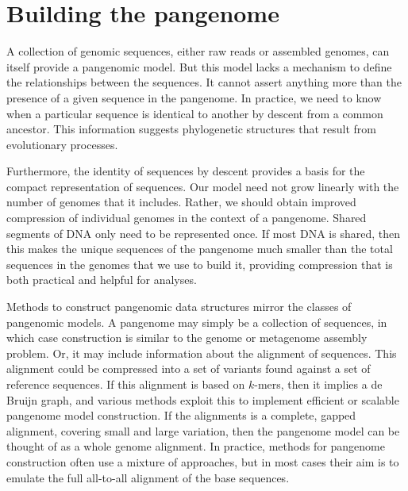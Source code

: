 \section{Building the pangenome}

A collection of genomic sequences, either raw reads or assembled genomes, can itself provide a pangenomic model.
But this model lacks a mechanism to define the relationships between the sequences.
It cannot assert anything more than the presence of a given sequence in the pangenome.
In practice, we need to know when a particular sequence is identical to another by descent from a common ancestor.
This information suggests phylogenetic structures that result from evolutionary processes.

Furthermore, the identity of sequences by descent provides a basis for the compact representation of sequences.
Our model need not grow linearly with the number of genomes that it includes.
Rather, we should obtain improved compression of individual genomes in the context of a pangenome.
Shared segments of DNA only need to be represented once.
If most DNA is shared, then this makes the unique sequences of the pangenome much smaller than the total sequences in the genomes that we use to build it, providing compression that is both practical and helpful for analyses.

Methods to construct pangenomic data structures mirror the classes of pangenomic models.
A pangenome may simply be a collection of sequences, in which case construction is similar to the genome or metagenome assembly problem.
Or, it may include information about the alignment of sequences.
This alignment could be compressed into a set of variants found against a set of reference sequences.
If this alignment is based on $k$-mers, then it implies a de Bruijn graph, and various methods exploit this to implement efficient or scalable pangenome model construction.
If the alignments is a complete, gapped alignment, covering small and large variation, then the pangenome model can be thought of as a whole genome alignment.
In practice, methods for pangenome construction often use a mixture of approaches, but in most cases their aim is to emulate the full all-to-all alignment of the base sequences.

\begin{comment}
PanTools https://github.com/Sheikhizadeh/pantools, https://www.ncbi.nlm.nih.gov/pmc/articles/PMC6158922/ \cite{Sheikhizadeh_Anari_2018}
TwoPaCo https://github.com/medvedevgroup/TwoPaCo, https://academic.oup.com/bioinformatics/article/33/24/4024/2725383 \cite{Minkin_2016}
McCortex https://github.com/mcveanlab/mccortex, https://www.ncbi.nlm.nih.gov/pubmed/29554215 and CortexJDK https://github.com/mcveanlab/CortexJDK, http://europepmc.org/abstract/PPR/PPR85394 from McVean's lab. \cite{Turner_2018}
LOGAN https://github.com/TonyBolger/LOGAN, https://www.biorxiv.org/content/10.1101/175976v1 \cite{Bolger_2017}
REVEAL https://github.com/jasperlinthorst/reveal \cite{linthorst2015scalable}
Bifrost \cite{holley2019bifrost}
\end{comment}

